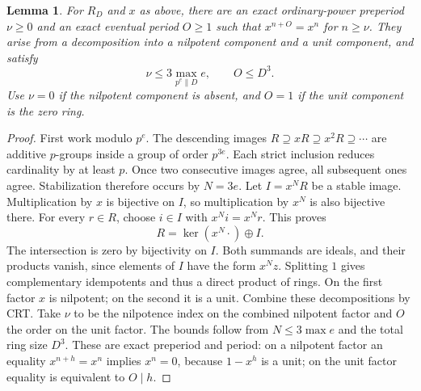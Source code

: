 \documentclass[11pt,a4paper]{article}
\newtheorem{lemma}[theorem]{Lemma}\newtheorem{proposition}[theorem]{Proposition}
\theoremstyle{definition}\newtheorem{definition}[theorem]{Definition}
\theoremstyle{remark}\newtheorem{remark}[theorem]{Remark}
\begin{document}
\begin{lemma}\label{R15:lem:decompose}
For $R_D$ and $x$ as above, there are an exact ordinary-power preperiod
$\nu\ge0$ and an exact eventual period $O\ge1$ such that
$x^{n+O}=x^n$ for $n\ge\nu$. They arise from a decomposition into a
nilpotent component and a unit component, and satisfy
\[
 \nu\le3\max_{p^e\parallel D}e,\qquad O\le D^3.
\]
Use $\nu=0$ if the nilpotent component is absent, and $O=1$ if the
unit component is the zero ring.
\end{lemma}
\begin{proof}
First work modulo $p^e$. The descending images
$R\supseteq xR\supseteq x^2R\supseteq\cdots$ are additive
$p$-groups inside a group of order $p^{3e}$. Each strict inclusion
reduces cardinality by at least $p$. Once two consecutive images
agree, all subsequent ones agree. Stabilization therefore occurs
by $N=3e$. Let $I=x^N R$ be a stable image. Multiplication by $x$
is bijective on $I$, so multiplication by $x^N$ is also bijective there.
For every $r\in R$, choose $i\in I$ with $x^N i=x^N r$.
This proves
\[
 R=\ker(x^N\cdot)\oplus I.
\]
The intersection is zero by bijectivity on $I$. Both summands are
ideals, and their products vanish, since elements of $I$ have the
form $x^Nz$. Splitting $1$ gives complementary idempotents and
thus a direct product of rings. On the first factor $x$ is nilpotent;
on the second it is a unit. Combine these decompositions by CRT.
Take $\nu$ to be the nilpotence index on the combined nilpotent
factor and $O$ the order on the unit factor. The bounds follow from
$N\le3\max e$ and the total ring size $D^3$. These are exact
preperiod and period: on a nilpotent factor an equality
$x^{n+h}=x^n$ implies $x^n=0$, because $1-x^h$ is a unit; on
the unit factor equality is equivalent to $O\mid h$.
\end{proof}
\end{document}
